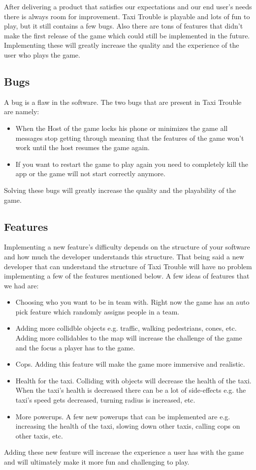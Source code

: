 After delivering a product that satisfies our expectations and our end user's needs there is always room for improvement. Taxi Trouble is playable and lots of fun to play, but it still contains a few bugs. Also there are tons of features that didn't make the first release of the game which could still be implemented in the future. Implementing these will greatly increase the quality and the experience of the user who plays the game.\\

\subsection*{Bugs}
A bug is a flaw in the software. The two bugs that are present in Taxi Trouble are namely:
\begin{itemize}
\item When the Host of the game locks his phone or minimizes the game all messages stop getting through meaning that the features of the game won't work until the host resumes the game again.
\item If you want to restart the game to play again you need to completely kill the app or the game will not start correctly anymore.
\end{itemize} 
Solving these bugs will greatly increase the quality and the playability of the game.

\subsection*{Features}
Implementing a new feature's difficulty depends on the structure of your software and how much the developer understands this structure. That being said a new developer that can understand the structure of Taxi Trouble will have no problem implementing a few of the features mentioned below. A few ideas of features that we had are:
\begin{itemize}
\item Choosing who you want to be in team with. Right now the game has an auto pick feature which randomly assigns people in a team.
\item Adding more collidble objects e.g. traffic, walking pedestrians, cones, etc. Adding more collidables to the map will increase the challenge of the game and the focus a player has to the game.
\item Cops. Adding this feature will make the game more immersive and realistic.
\item Health for the taxi. Colliding with objects will decrease the health of the taxi. When the taxi's health is decreased there can be a lot of side-effects e.g. the taxi's speed gets decreased, turning radius is increased, etc.
\item More powerups. A few new powerups that can be implemented are e.g. increasing the health of the taxi, slowing down other taxis, calling cops on other taxis, etc.
\end{itemize}
Adding these new feature will increase the experience a user has with the game and will ultimately make it more fun and challenging to play.



